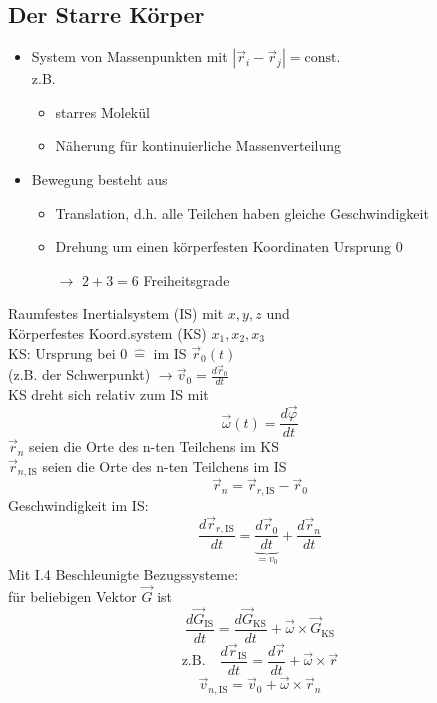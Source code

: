 \documentclass[titlepage,12pt,a4paper,ngerman]{report}
\newcommand{\tx}[1]{\textrm{#1}}
\newcommand{\ub}[1]{\underbrace{#1}}
\begin{document}
{\subsection{Der Starre Körper}
\begin{itemize}
	\item System von Massenpunkten mit $ |\vec{r}_i - \vec{r}_j | = \tx{const.} $\\
	z.B.
	\begin{itemize}
		\item starres Molekül
		\item Näherung für kontinuierliche Massenverteilung
	\end{itemize}
	\item Bewegung besteht aus
	\begin{itemize}
		\item Translation, d.h. alle Teilchen haben gleiche Geschwindigkeit
		\item Drehung um einen körperfesten Koordinaten Ursprung $ 0 $
		\item[$ \rightarrow $] $ 2+3=6 $ Freiheitsgrade
	\end{itemize}
\end{itemize}
Raumfestes Inertialsystem (IS) mit $ x,y,z $ und \\
Körperfestes Koord.system (KS) $ x_1,x_2,x_3 $\\
KS: Ursprung bei $ 0 \ \widehat{=} $ im IS $ \vec{r}_0(t) $\\
(z.B. der Schwerpunkt) $ \rightarrow \vec{v}_0 = \frac{d\vec{r}_0}{dt} $\\
KS dreht sich relativ zum IS mit
$$ \vec{\omega}(t) = \frac{d\vec{\varphi}}{dt}$$
$ \vec{r}_n $ seien die Orte des n-ten Teilchens im KS\\
$ \vec{r}_{n,\tx{IS}} $ seien die Orte des n-ten Teilchens im IS
$$ \vec{r}_n = \vec{r}_{r,\tx{IS}} - \vec{r}_0$$
Geschwindigkeit im IS:
$$ \frac{d \vec{r}_{r,\tx{IS}}}{dt} = \ub{\frac{ d \vec{r}_0}{dt}}_{= v_0} + \frac{d\vec{r}_n}{dt}$$
Mit I.4 Beschleunigte Bezugssysteme: \\
für beliebigen Vektor $ \vec{G} $ ist
\begin{equation}
\frac{d\vec{G}_{\tx{IS}}}{dt} = \frac{d \vec{G}_{\tx{KS}}}{dt} + \vec{\omega} \times \vec{G}_{\tx{KS}} \tag{$*$}
\end{equation}
$$ \tx{z.B.} \quad \frac{d \vec{r}_{\tx{IS}}}{dt} = \frac{d \vec{r}}{dt} + \vec{\omega} \times \vec{r}$$
\begin{equation}
\vec{v}_{n,\tx{IS}} = \vec{v}_0 + \vec{\omega}\times \vec{r}_n \tag{1}
\end{equation}
}
\end{document}
